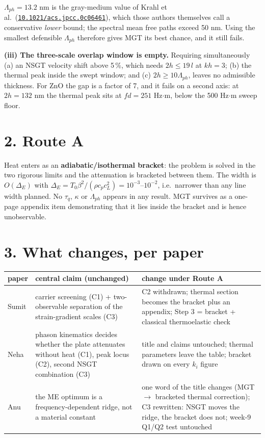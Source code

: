 \documentclass[11pt]{article}
\newcommand{\doi}[1]{\href{https://doi.org/#1}{\texttt{#1}}}
\begin{document}
\noindent$\Lambda_{ph}=13.2$ nm is the gray-medium value of Krahl et al.\ (\doi{10.1021/acs.jpcc.0c06461}),
which those authors themselves call a conservative \emph{lower} bound; the spectral mean free paths
exceed 50 nm. Using the smallest defensible $\Lambda_{ph}$ therefore gives MGT its best chance, and it
still fails.

\textbf{(iii) The three-scale overlap window is empty.} Requiring simultaneously (a) an NSGT velocity
shift above 5\,\%, which needs $2h\le 19\,l$ at $kh=3$; (b) the thermal peak inside the swept window;
and (c) $2h\ge 10\Lambda_{ph}$, leaves no admissible thickness. For ZnO the gap is a factor of 7, and it
fails on a second axis: at $2h=132$ nm the thermal peak sits at $fd=251$ Hz$\cdot$m, below the
500 Hz$\cdot$m sweep floor.

\section*{2. Route A}

Heat enters as an \textbf{adiabatic/isothermal bracket}: the problem is solved in the two rigorous
limits and the attenuation is bracketed between them. The width is $O(\Delta_E)$ with
$\Delta_E=T_0\beta^2/(\rho c_pc_L^2)=10^{-3}$--$10^{-2}$, i.e.\ narrower than any line width planned.
No $\tau_q$, $\kappa$ or $\Lambda_{ph}$ appears in any result. MGT survives as a one-page appendix item
demonstrating that it lies inside the bracket and is hence unobservable.

\section*{3. What changes, per paper}

\begin{center}\small
\begin{tabular}{p{2.2cm}p{4.6cm}p{7.4cm}}
\toprule
paper & central claim (unchanged) & change under Route A\\
\midrule
Sumit & carrier screening (C1) + two-observable separation of the strain-gradient scales (C3) &
C2 withdrawn; thermal section becomes the bracket plus an appendix; Step 3 = bracket + classical
thermoelastic check\\
Neha & phason kinematics decides whether the plate attenuates without heat (C1), peak locus (C2),
second NSGT combination (C3) & title and claims untouched; thermal parameters leave the table; bracket
drawn on every $k_i$ figure\\
Anu & the ME optimum is a frequency-dependent ridge, not a material constant & one word of the title
changes (MGT $\to$ bracketed thermal correction); C3 rewritten: NSGT moves the ridge, the bracket does
not; week-9 Q1/Q2 test untouched\\
\bottomrule
\end{tabular}
\end{center}
\end{document}
